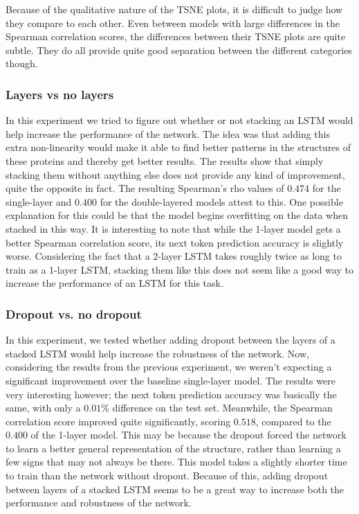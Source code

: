 Because of the qualitative nature of the TSNE plots, it is difficult to judge how they compare to each other. Even between models with large differences in the Spearman correlation scores, the differences between their TSNE plots are quite subtle. They do all provide quite good separation between the different categories though.
\subsubsection{Layers vs no layers}
In this experiment we tried to figure out whether or not stacking an LSTM would help increase the performance of the network. The idea was that adding this extra non-linearity would make it able to find better patterns in the structures of these proteins and thereby get better results. The results show that simply stacking them without anything else does not provide any kind of improvement, quite the opposite in fact. The resulting Spearman's rho values of $0.474$ for the single-layer and $0.400$ for the double-layered models attest to this. One possible explanation for this could be that the model begins overfitting on the data when stacked in this way. It is interesting to note that while the 1-layer model gets a better Spearman correlation score, its next token prediction accuracy is slightly worse. Considering the fact that a 2-layer LSTM takes roughly twice as long to train as a 1-layer LSTM, stacking them like this does not seem like a good way to increase the performance of an LSTM for this task.

\subsubsection{Dropout vs. no dropout}
In this experiment, we tested whether adding dropout between the layers of a stacked LSTM would help increase the robustness of the network. Now, considering the results from the previous experiment, we weren't expecting a significant improvement over the baseline single-layer model. The results were very interesting however; the next token prediction accuracy was basically the same, with only a $0.01\%$ difference on the test set. Meanwhile, the Spearman correlation score improved quite significantly, scoring $0.518$, compared to the $0.400$ of the 1-layer model. This may be because the dropout forced the network to learn a better general representation of the structure, rather than learning a few signs that may not always be there. This model takes a slightly shorter time to train than the network without dropout. Because of this, adding dropout between layers of a stacked LSTM seems to be a great way to increase both the performance and robustness of the network.

